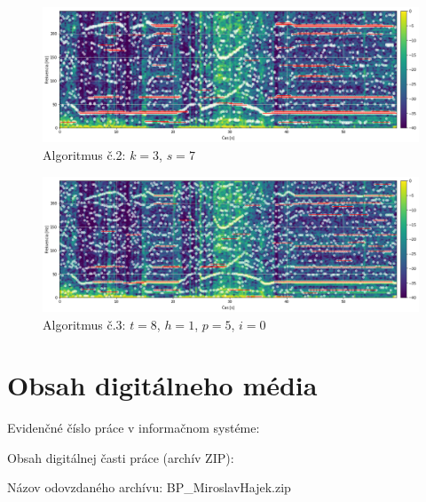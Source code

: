 \begin{figure}[h]
	\centering
    \includegraphics[width=\textwidth]{figures/verification/L35-dataset-A2.png}
    \caption{Algoritmus č.2: $k = 3$, $s = 7$}
\end{figure}

\begin{figure}[h]
	\centering
    \includegraphics[width=\textwidth]{figures/verification/L35-dataset-A3.png}
    \caption{Algoritmus č.3: $t = 8$, $h = 1$, $p = 5$, $i = 0$}
\end{figure}


\thispagestyle{empty}
\setcounter{figure}{0}
\chapter{Obsah digitálneho média}
\renewcommand*{\thepage}{E-\arabic{page}}
\par Evidenčné číslo práce v informačnom systéme: \RegNo
\par Obsah digitálnej časti práce (archív ZIP):
\par Názov odovzdaného archívu: BP\_MiroslavHajek.zip

